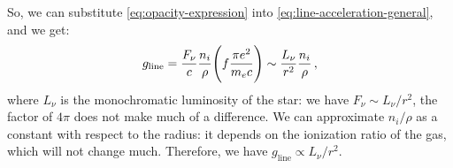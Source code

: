 \documentclass[main.tex]{subfiles}
\begin{document}

So, we can substitute \eqref{eq:opacity-expression} into \eqref{eq:line-acceleration-general}, and we get:
%
\begin{align}
g_{\text{line}} = \frac{F_{\nu }}{c} \frac{n_i}{\rho } \qty(f \frac{\pi e^2}{m_e c}) \sim \frac{L_{\nu }}{r^2} \frac{n_i}{\rho }
\,,
\end{align}
%
where \(L_{\nu }\) is the monochromatic luminosity of the star: we have \(F_{\nu } \sim L_{\nu }/ r^2\), the factor of \(4 \pi \) does not make much of a difference.
We can approximate \(n_i / \rho \) as a constant with respect to the radius: it depends on the ionization ratio of the gas, which will not change much. Therefore, we have \(g _{\text{line}} \propto L_{\nu } / r^2\).
\end{document}
